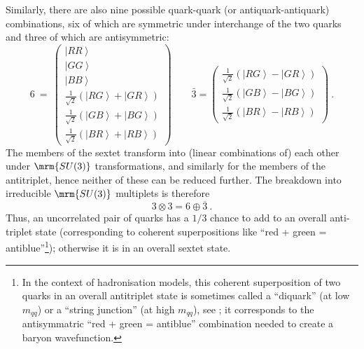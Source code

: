 Similarly, there are also nine possible quark-quark (or
antiquark-antiquark) combinations, six of which are symmetric
under interchange of the two quarks and three of which are antisymmetric:
%
\begin{equation}
6 ~=~ \left(\begin{array}{c}
\left|RR\right>\\
\left|GG\right>\\
\left|BB\right>\\
\frac{1}{\sqrt{2}}\left(\left|RG\right> + \left|GR\right>\right)\\
\frac{1}{\sqrt{2}}\left(\left|GB\right> + \left|BG\right>\right)\\
\frac{1}{\sqrt{2}}\left(\left|BR\right> + \left|RB\right>\right)
\end{array}\right)
~~~~~~~~~
\bar{3} = \left(\begin{array}{c}
\frac{1}{\sqrt{2}}\left(\left|RG\right> - \left|GR\right>\right)\\
\frac{1}{\sqrt{2}}\left(\left|GB\right> - \left|BG\right>\right)\\
\frac{1}{\sqrt{2}}\left(\left|BR\right> - \left|RB\right>\right)
\end{array}\right)~.
\end{equation}
The members of the sextet transform into (linear combinations of) 
each other under $\mrm{SU(3)}$ transformations, and similarly for the
members of the antitriplet, hence neither of these can be reduced
further. The breakdown into
irreducible $\mrm{SU(3)}$ multiplets is therefore
\begin{equation}
3 \otimes 3 = 6 \oplus \overline{3}~.
\end{equation}
Thus, an uncorrelated pair of quarks has a $1/3$ chance to add to an overall
anti-triplet state (corresponding to coherent
superpositions like ``red + green = antiblue''\footnote{In the context of
  hadronisation models, 
  this coherent superposition of two quarks in an overall antitriplet
  state is sometimes called a
  ``diquark'' (at low $m_{qq}$)
  or a ``string junction'' (at high $m_{qq}$), see
  ; it corresponds to the antisymmatric ``red
  + green = antiblue'' combination needed to create a baryon
  wavefunction. }); otherwise it is in an overall 
sextet state. 

